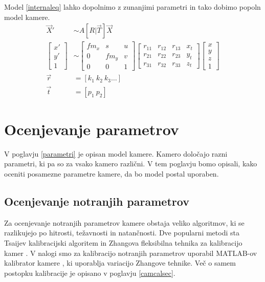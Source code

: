 \documentclass[a4paper, 12pt]{book}
\begin{document}
Model \eqref{internaleq} lahko dopolnimo z zunanjimi parametri in tako dobimo popoln model kamere.
\begin{align}
\label{totalmodel}
\vec{X}' &\sim A[R | \vec{T}] \vec{X} \\
\begin{bmatrix}
x' \\
y' \\
1
\end{bmatrix}
&\sim
\begin{bmatrix}
fm_x & s & u \\
0 & fm_y & v \\
0 & 0 & 1
\end{bmatrix}
\begin{bmatrix}
r_{11} & r_{12} & r_{13} & x_t\\
r_{21} & r_{22} & r_{23} & y_t\\
r_{31} & r_{32} & r_{33} & z_t
\end{bmatrix}
\begin{bmatrix}
x \\
y \\
z \\
1
\end{bmatrix} \\
\vec{r} &= [k_1 \ k_2 \ k_3 \dots] \\
\vec{t} &= [p_1 \ p_2]
\end{align}

\section{Ocenjevanje parametrov}
V poglavju \ref{parametri} je opisan model kamere. Kamero določajo razni parametri, ki pa so za vsako kamero različni. V tem poglavju bomo opisali, kako oceniti posamezne parametre kamere, da bo model postal uporaben.

\subsection{Ocenjevanje notranjih parametrov}
Za ocenjevanje notranjih parametrov kamere obstaja veliko algoritmov, ki se razlikujejo po hitrosti, težavnosti in natančnosti. Dve popularni metodi sta Tsaijev kalibracijski algoritem \cite{horn2000tsai} in Zhangova fleksibilna tehnika za kalibracijo kamer \cite{zhang2000flexible}. V nalogi smo za kalibracijo notranjih parametrov uporabil MATLAB-ov kalibrator kamere \cite{matlabcalib}, ki uporablja variacijo Zhangove tehnike. Več o samem postopku kalibracije je opisano v poglavju \ref{camcalsec}. 
\end{document}
